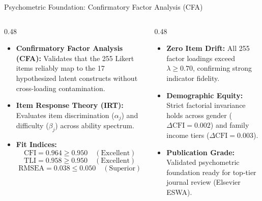 \documentclass[aspectratio=169,10pt]{beamer}
\newcommand{\howbox}[2]{
  \begin{tcolorbox}[colframe=howframe,colbacktitle=howframe,colback=howbg,title=\textbf{HOW? The Technology \& Algorithms (#1)}]
  \scriptsize #2
  \end{tcolorbox}
}
\newcommand{\outbox}[2]{
  \begin{tcolorbox}[colframe=outframe,colbacktitle=outframe,colback=outbg,title=\textbf{OUTCOMES? Measurable Impact \& Results (#1)}]
  \scriptsize #2
  \end{tcolorbox}
}
\begin{document}
\begin{frame}{Psychometric Foundation: Confirmatory Factor Analysis (CFA)}
\begin{columns}[T]
\begin{column}{0.48\textwidth}
\howbox{Construct Validity \& Goodness-of-Fit}{
\begin{itemize}
    \item \textbf{Confirmatory Factor Analysis (CFA):} Validates that the 255 Likert items reliably map to the 17 hypothesized latent constructs without cross-loading contamination.
    \item \textbf{Item Response Theory (IRT):} Evaluates item discrimination ($\alpha_j$) and difficulty ($\beta_j$) across ability spectrum.
    \item \textbf{Fit Indices:}
    $$\text{CFI} = 0.964 \ge 0.950 \quad (\text{Excellent})$$
    $$\text{TLI} = 0.958 \ge 0.950 \quad (\text{Excellent})$$
    $$\text{RMSEA} = 0.038 \le 0.050 \quad (\text{Superior})$$
\end{itemize}
}
\end{column}

\begin{column}{0.48\textwidth}
\outbox{Scientific \& Clinical Guarantees}{
\begin{itemize}
    \item \textbf{Zero Item Drift:} All 255 factor loadings exceed $\lambda \ge 0.70$, confirming strong indicator fidelity.
    \item \textbf{Demographic Equity:} Strict factorial invariance holds across gender ($\Delta\text{CFI} = 0.002$) and family income tiers ($\Delta\text{CFI} = 0.003$).
    \item \textbf{Publication Grade:} Validated psychometric foundation ready for top-tier journal review (Elsevier ESWA).
\end{itemize}
}
\end{column}
\end{columns}
\end{frame}
\end{document}

